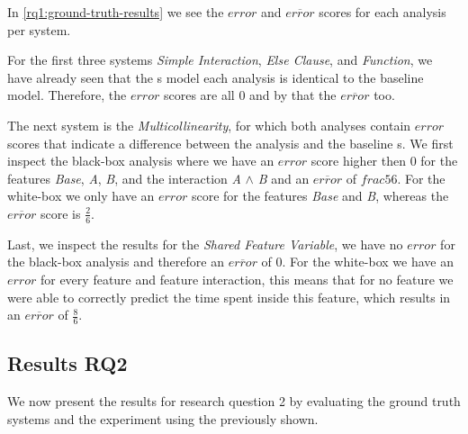 In \autoref{rq1:ground-truth-results} we see the $error$ and $\overline{error}$ scores for each analysis per system. 

For the first three systems \emph{Simple Interaction}, \emph{Else Clause}, and \emph{Function},
we have already seen that the {\perfInfluenceModel}s model each analysis is identical to the baseline model. 
Therefore, the $error$ scores are all $0$ and by that the $\overline{error}$ too.

The next system is the \emph{Multicollinearity}, for which both analyses contain $error$ scores that indicate a difference 
between the analysis and the baseline {\perfInfluenceModel}s. We first inspect the black-box analysis {\perfInfluenceModel} 
where we have an $error$ score higher then $0$ for the features \emph{Base}, \emph{A}, \emph{B}, 
and the interaction \emph{A} $\land$ \emph{B} and an $\overline{error}$ of $frac{5}{6}$. 
For the white-box we only have an $error$ score for the features \emph{Base} and \emph{B}, whereas the $\overline{error}$ score is $\frac{2}{6}$.

Last, we inspect the results for the \emph{Shared Feature Variable}, we have no $error$ for the black-box analysis and therefore an $\overline{error}$
of $0$. For the white-box we have an $error$ for every feature and feature interaction, this means that for no feature we were able to
correctly predict the time spent inside this feature, which results in an $\overline{error}$ of  $\frac{8}{6}$.

\subsection{Results RQ2}

We now present the results for research question 2 by evaluating the ground truth systems and the experiment using the {\perfInfluenceModel} 
previously shown.

